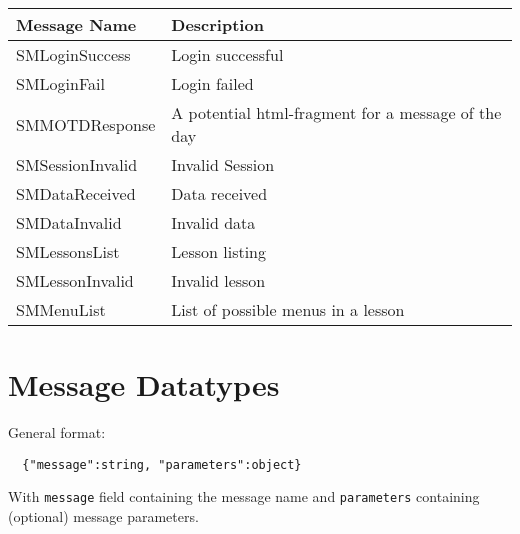 \documentclass{scrartcl}
\begin{document}
\begin{itemize}
  \begin{tabular}{ll}
    Message Name      & Description \\
    \hline
    SMLoginSuccess & Login successful \\
    SMLoginFail     & Login failed \\
    SMMOTDResponse    & A potential html-fragment for a message of the day \\
    SMSessionInvalid  & Invalid Session \\
    SMDataReceived    & Data received \\
    SMDataInvalid     & Invalid data \\
    SMLessonsList     & Lesson listing \\
    SMLessonInvalid   & Invalid lesson \\
    SMMenuList        & List of possible menus in a lesson \\
  \end{tabular}

\end{itemize}

\section{Message Datatypes}

General format:
\begin{lstlisting}
  {"message":string, "parameters":object}
\end{lstlisting}
With \texttt{message} field containing the message name and \texttt{parameters} containing (optional) message parameters.
\end{document}
